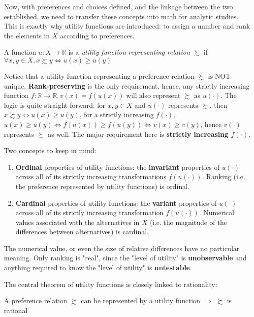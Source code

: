 Now, with preferences and choices defined, and the linkage between the two established, we need to transfer these concepts into math for analytic studies.
This is exactly why utility functions are introduced: to assign a number and rank the elements in $X$ according to preferences.

\begin{definition}\label{def_utility}
    A function $u:X\rightarrow\mathbb{R}$ is a \textit{utility function representing relation} $\succsim$ if $\forall x,y\in X,x\succsim y\Leftrightarrow u(x)\geq u(y)$
\end{definition}

Notice that a utility function representing a preference relation $\succsim$ is NOT unique. \textbf{Rank-preserving} is the only requirement, hence, any 
strictly increasing function $f:\mathbb{R}\rightarrow\mathbb{R},v(x)=f(u(x))$ will also represent $\succsim$ as $u(\cdot)$. The logic is quite straight forward: for $x,y\in X$ and $u(\cdot)$ represents $\succsim$, then $x\succsim y \Leftrightarrow u(x)\geq u(y)$, for a strictly increasing $f(\cdot)$, $u(x)\geq u(y)\Leftrightarrow f(u(x))\geq f(u(y))\Leftrightarrow v(x)\geq v(y)$, hence $v(\cdot)$ represents $\succsim$ as well.
The major requirement here is \textbf{strictly increasing $f(\cdot)$}.

Two concepts to keep in mind:
\begin{enumerate}
    \item \textbf{Ordinal} properties of utility functions: the \textbf{invariant} properties of $u(\cdot)$ across all of its strictly increasing transformations $f(u(\cdot))$. Ranking (i.e. the preference represented by utility functions) is ordinal.
    \item \textbf{Cardinal} properties of utility functions: the \textbf{variant} properties of $u(\cdot)$ across all of its strictly increasing transformation $f(u(\cdot))$. Numerical values associated with the alternatives in $X$ (i.e. the magnitude of the differences between alternatives) is cardinal.
\end{enumerate}

The numerical value, or even the size of relative differences have no particular meaning. Only ranking is "real", since the "level of utility" is \textbf{unobservable} and anything required to know the "level of utility" is \textbf{untestable}.

The central theorem of utility functions is closely linked to rationality:
\begin{theorem}\label{thm_utility_is_rational}
    A preference relation $\succsim$ can be represented by a utility function $\Rightarrow$ $\succsim$ is rational
\end{theorem}

